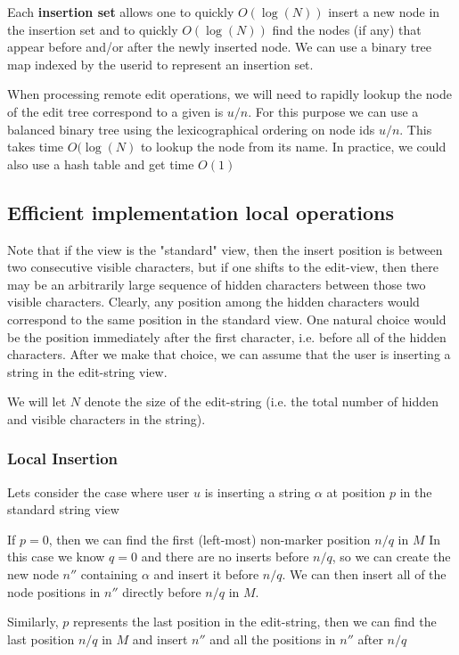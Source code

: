 \documentclass{amsart}
\begin{document}
Each {\bf insertion set} allows one to quickly $O(\log(N))$ insert a new node 
in the insertion set
and to quickly $O(\log(N))$ find the nodes (if any) that appear before and/or
after the newly inserted node. We can use a binary tree map indexed by
the userid to represent an insertion set.

When processing remote edit operations, we will need to rapidly lookup
the node of the edit tree correspond to a given is $u/n$. For this purpose
we can use a balanced binary tree using the lexicographical ordering on
node ids $u/n$. This takes time $O(\log(N)$ to lookup the node from its
name.  In practice, we could also use a hash table and get time $O(1)$

\subsection{Efficient implementation local operations}

Note that if the view is the "standard" view, then the insert position is between
two consecutive visible characters, but if one shifts to the edit-view, then
there may be an arbitrarily large sequence of hidden characters between those
two visible characters. Clearly, any position among the hidden characters
would correspond to the same position in the standard view. One natural choice would
be the position immediately after the first character, i.e. before all of the hidden
characters.  After we make that choice, we can assume that the user is inserting
a string in the edit-string view.

We will let $N$ denote the size of the edit-string (i.e. the total number of
hidden and visible characters in the string).


\subsubsection{Local Insertion}
Lets consider the case where user $u$ 
is inserting a string $\alpha$ at position $p$ in the standard string view


If $p=0$, then we can find the first (left-most) non-marker position $n/q$ in $M$
In this case we know $q=0$ and there are no inserts before $n/q$, so we
can create the new node $n''$ containing $\alpha$ and insert it before $n/q$.
We can then insert all of the node positions in $n''$ directly before $n/q$ in $M$.

Similarly, $p$ represents the last position in the edit-string, then we can
find the last position $n/q$ in $M$ and insert $n''$ and all the positions
in $n''$ after $n/q$
\end{document}
